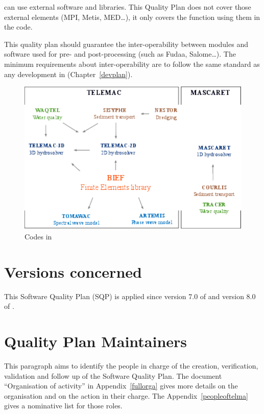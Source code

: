 \telemacsystem{} can use external software and libraries. This Quality Plan
does not cover those external elements (MPI, Metis, MED\ldots), it only covers
the function using them in the code.

This quality plan should guarantee the inter-operability between
\telemacsystem{} modules and software used for pre- and post-processing (such
as Fudaa, Salome\ldots).  The minimum requirements about inter-operability are
to follow the same standard as any development in \telemacsystem{}
(Chapter~\ref{devplan}).

\begin{figure}[H]
  \includegraphics{graphics/telemac-mascaret.pdf}
\caption{\label{telma_codes} Codes in \telemacsystem{}}
\end{figure}

\section{Versions concerned}

This Software Quality Plan (SQP) is applied since version 7.0 of \tel{} and
version 8.0 of \mascaret.

\section{Quality Plan Maintainers}

This paragraph aims to identify the people in charge of the creation,
verification, validation and follow up of the Software Quality Plan. The
document ``Organisation of \telemacsystem{} activity'' in
Appendix~\ref{fullorga} gives more details on the organisation and on the
action in their charge. The Appendix~\ref{peopleoftelma} gives a nominative
list for those roles.


